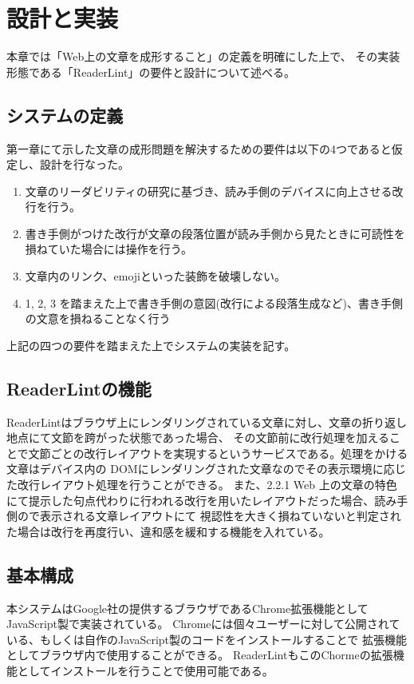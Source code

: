 

\chapter{設計と実装}
\label{chap:system}
本章では「Web上の文章を成形すること」の定義を明確にした上で、
その実装形態である「ReaderLint」の要件と設計について述べる。

\section{システムの定義}
第一章にて示した文章の成形問題を解決するための要件は以下の4つであると仮定し、設計を行なった。

\begin{enumerate}
	\item 文章のリーダビリティの研究に基づき、読み手側のデバイスに向上させる改行を行う。
	\item 書き手側がつけた改行が文章の段落位置が読み手側から見たときに可読性を損ねていた場合には操作を行う。
	\item 文章内のリンク、emojiといった装飾を破壊しない。
	\item 1, 2, 3 を踏まえた上で書き手側の意図(改行による段落生成など)、書き手側の文意を損ねることなく行う
\end{enumerate}
上記の四つの要件を踏まえた上でシステムの実装を記す。

\newpage

\section{ReaderLintの機能}
ReaderLintはブラウザ上にレンダリングされている文章に対し、文章の折り返し地点にて文節を跨がった状態であった場合、
その文節前に改行処理を加えることで文節ごとの改行レイアウトを実現するというサービスである。処理をかける文章はデバイス内の
DOMにレンダリングされた文章なのでその表示環境に応じた改行レイアウト処理を行うことができる。
また、2.2.1 Web 上の文章の特色 にて提示した句点代わりに行われる改行を用いたレイアウトだった場合、読み手側ので表示される文章レイアウトにて
視認性を大きく損ねていないと判定された場合は改行を再度行い、違和感を緩和する機能を入れている。

\section{基本構成}

本システムはGoogle社の提供するブラウザであるChrome拡張機能としてJavaScript製で実装されている。
Chromeには個々ユーザーに対して公開されている、もしくは自作のJavaScript製のコードをインストールすることで
拡張機能としてブラウザ内で使用することができる。
ReaderLintもこのChormeの拡張機能としてインストールを行うことで使用可能である。

